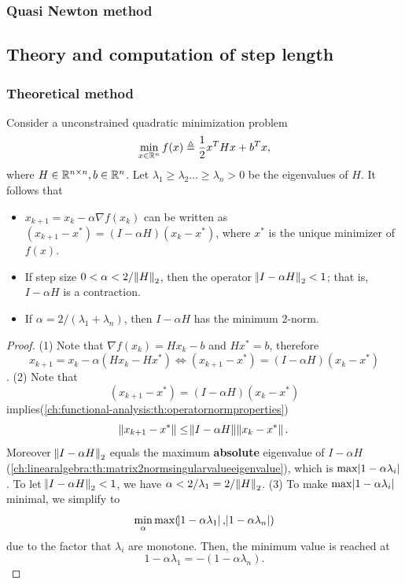 \begin{refsection}
\subsubsection{Quasi Newton method}


\subsection{Theory and computation of step length}
\subsubsection{Theoretical method}

\begin{lemma}
Consider a unconstrained quadratic minimization problem
$$\min_{x\in \mathbb{R}^n} f(x) \triangleq \frac{1}{2}x^THx + b^Tx,$$
where $H\in \mathbb{R}^{n\times n}, b\in \mathbb{R}^n$.  
Let $\lambda_1\geq \lambda_2 ... \geq \lambda_n > 0$ be the eigenvalues of $H$. It follows that
\begin{itemize}
	\item $x_{k+1} = x_k - \alpha \nabla f(x_k)$ can be written as
	$(x_{k+1} - x^*) = (I - \alpha H)(x_k - x^*)$, where $x^*$ is the unique minimizer of $f(x)$.
	\item If step size $0 < \alpha < 2/\norm{H}_2$, then the operator
	$\norm{I - \alpha H}_2 < 1$; that is, $I - \alpha H$ is a contraction.
	\item If $\alpha = 2/(\lambda_1+\lambda_n)$, then $I - \alpha H$ has the minimum 2-norm.
\end{itemize}
\end{lemma}
\begin{proof}
(1) Note that $\nabla f(x_k) = Hx_k - b$ and $Hx^* = b$, therefore
$$x_{k+1} = x_k - \alpha(Hx_k - Hx^*) \Leftrightarrow (x_{k+1} - x^*) = (I - \alpha H)(x_k - x^*)$$.
(2) Note that 
$$(x_{k+1} - x^*) = (I - \alpha H)(x_k - x^*)$$
implies(\autoref{ch:functional-analysis:th:operatornormproperties})
$$\norm{x_{k+1} - x^*} \leq \norm{I - \alpha H}\norm{x_k - x^*}.$$
Moreover $\norm{I - \alpha H}_2$ equals the maximum \textbf{absolute} eigenvalue of $I - \alpha H$ (\autoref{ch:linearalgebra:th:matrix2normsingularvalueeigenvalue}), which is $\max \abs{1-\alpha \lambda_i}$. To let $\norm{I - \alpha H}_2 < 1$, we have $\alpha < 2/\lambda_1 = 2/\norm{H}_2$.
(3) To make $\max \abs{1-\alpha \lambda_i}$ minimal, we simplify to 
$$\min_{\alpha} \max(\abs{1-\alpha \lambda_1}, \abs{1-\alpha \lambda_n})$$
due to the factor that $\lambda_i$ are monotone. Then, the minimum value is reached at
$$1-\alpha \lambda_1 = -(1-\alpha \lambda_n).$$ 
\end{proof}


\end{refsection}

